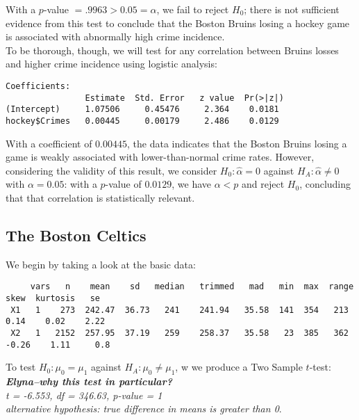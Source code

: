 \documentclass{article}
\begin{document}
With a $p$-value $= .9963 > 0.05 = \alpha$, we fail to reject $H_0$; there is not sufficient evidence from this test to conclude that the Boston Bruins losing a hockey game is associated with abnormally high crime incidence. \\

To be thorough, though, we will test for any correlation between Bruins losses and higher crime incidence using logistic analysis: \\

\begin{verbatim}
Coefficients:
                Estimate  Std. Error   z value  Pr(>|z|)
(Intercept)     1.07506     0.45476     2.364    0.0181
hockey$Crimes   0.00445     0.00179     2.486    0.0129
\end{verbatim}

With a coefficient of $0.00445$, the data indicates that the Boston Bruins losing a game is weakly associated with lower-than-normal crime rates. However, considering the validity of this result, we consider $H_0: \hat{\alpha} = 0$ against $H_A: \hat{\alpha} \neq 0$ with $\alpha = 0.05$: with a $p$-value of $0.0129$, we have $\alpha < p$ and reject $H_0$, concluding that that correlation is statistically relevant. 

\subsection{The Boston Celtics}
We begin by taking a look at the basic data: 

\begin{verbatim}
     vars   n    mean    sd   median   trimmed   mad   min  max  range   skew  kurtosis   se
 X1   1    273  242.47  36.73   241    241.94   35.58  141  354   213    0.14    0.02    2.22
 X2   1   2152  257.95  37.19   259    258.37   35.58   23  385   362   -0.26    1.11     0.8
\end{verbatim}

To test $H_0: \mu_0 = \mu_1$ against $H_A: \mu_0 \neq \mu_1$, w we produce a Two Sample $t$-test: \textit{\textbf{Elyna--why this test in particular?}}\\

\textit{
t = -6.553, df = 346.63, p-value = 1\\
alternative hypothesis: true difference in means is greater than 0}. \\
\end{document}
